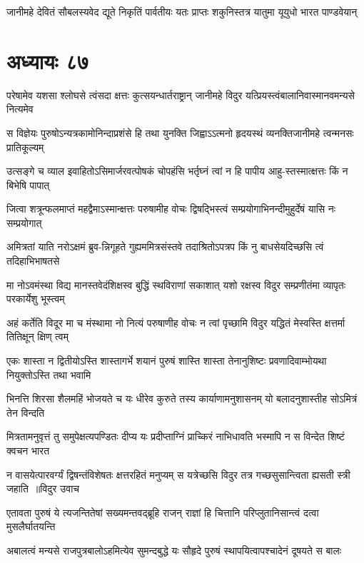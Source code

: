 \twolineshloka
{जानीमहे देवितं सौबलस्यवेद द्यूते निकृतिं पार्वतीयः}
{यतः प्राप्तः शकुनिस्तत्र यातुमा यूयुधो भारत पाण्डवेयान्}


\chapter{अध्यायः ८७}
\twolineshloka
{परेषामेव यशसा श्लोघसे त्वंसदा क्षत्तः कुत्सयन्धार्तराष्ट्रान्}
{जानीमहे विदुर यत्प्रियस्त्वंबालानिवास्मानवमन्यसे नित्यमेव}


\twolineshloka
{स विज्ञेयः पुरुषोऽन्यत्रकामोनिन्दाप्रशंसे हि तथा युनक्ति}
{जिह्वाऽऽत्मनो हृदयस्थं व्यनक्तिजानीमहे त्वन्मनसः प्रातिकूल्यम्}


\twolineshloka
{उत्सङ्गे च व्याल इवाहितोऽसिमार्जरवत्पोषकं चोपहंसि}
{भर्तृघ्नं त्वां न हि पापीय आहु-स्तस्मात्क्षत्तः किं न बिभेषि पापात्}


\twolineshloka
{जित्वा शत्रून्फलमाप्तं महद्वैमाऽस्मान्क्षत्तः परुषामीह वोचः}
{द्विषद्भिस्त्वं सम्प्रयोगाभिनन्दीमुहुर्देषं यासि नः सम्प्रयोगात्}


\twolineshloka
{अमित्रतां याति नरोऽक्षमं ब्रुव-न्निगूहते गुह्यममित्रसंस्तवे}
{तदाश्रितोऽपत्रप किं नु बाधसेयदिच्छसि त्वं तदिहाभिभाषतसे}


\twolineshloka
{मा नोऽवमंस्था विद्य मानस्तवेदंशिक्षस्व बुद्धिं स्थविराणां सकाशात्}
{यशो रक्षस्व विदुर सम्प्रणीतंमा व्यापृतः परकार्येशु भूस्त्वम्}


\twolineshloka
{अहं कर्तेति विदूर मा च मंस्थामा नो नित्यं परुषाणीह वोचः}
{न त्वां पृच्छामि विदुर यद्धितं मेस्वस्ति क्षत्तर्मा तितिक्षून् क्षिण् त्वम्}


\twolineshloka
{एकः शास्ता न द्वितीयोऽस्ति शास्तागर्भे शयानं पुरुषं शास्ति शास्ता}
{तेनानुशिष्टः प्रवणादिवाम्भोयथा नियुक्तोऽस्ति तथा भवामि}


\threelineshloka
{भिनत्ति शिरसा शैलमहिं भोजयते च यः}
{धीरेव कुरुते तस्य कार्याणामनुशासनम्}
{यो बलादनुशास्तीह सोऽमित्रं तेन विन्दति}


\threelineshloka
{मित्रतामनुवृत्तं तु समुपेक्षत्यपण्डितः}
{दीप्य यः प्रदीप्ताग्निं प्राच्किरं नाभिधावति}
{भस्मापि न स विन्देत शिष्टं क्वचन भारत}


\twolineshloka
{न वासयेत्पारवर्ग्यं द्विषन्तंविशेषतः क्षत्तरहितं मनुप्यम्}
{स यत्रेच्छसि विदुर तत्र गच्छसुसान्त्विता ह्यसती स्त्री जहाति ॥विदुर उवाच}


\twolineshloka
{एतावता पुरुषं ये त्यजन्तितेषां सख्यमन्तवद्ब्रूहि राजन्}
{राज्ञां हि चित्तानि परिप्लुतानिसान्त्वं दत्वा मुसलैर्घातयन्ति}


\twolineshloka
{अबालत्वं मन्यसे राजपुत्रबालोऽहमित्येव सुमन्दबुद्धे}
{यः सौहृदे पुरुषं स्थापयित्वापश्चादेनं दूषयते स बालः}


